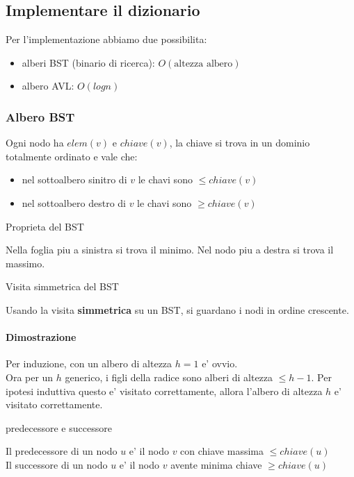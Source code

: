 \subsection{Implementare il dizionario}
Per l'implementazione abbiamo due possibilita:
\begin{itemize}
    \item alberi BST (binario di ricerca): \(O(\text{altezza albero})\)
    \item albero AVL: \(O(log n)\)
\end{itemize}

\subsubsection{Albero BST}
    Ogni nodo ha \(elem(v)\) e \(chiave(v)\), la chiave si trova in un dominio totalmente ordinato
    e vale che:
    \begin{itemize}
        \item nel sottoalbero sinitro di \(v\) le chavi sono \(\leq chiave(v)\)
        \item nel sottoalbero destro di \(v\) le chavi sono \(\ge chiave(v)\)
    \end{itemize}

    \begin{definition}{Proprieta del BST}

        Nella foglia piu a sinistra si trova il minimo. Nel nodo piu a destra si trova il massimo.
    \end{definition}

    \begin{definition}{Visita simmetrica del BST}

        Usando la visita \textbf{simmetrica} su un BST, si guardano i nodi in ordine crescente. 
    \end{definition}
    
    \paragraph{Dimostrazione}
        Per induzione, con un albero di altezza \(h=1\) e' ovvio. \\
        Ora per un \(h\) generico, i figli della radice sono alberi di altezza $\leq h-1$.
        Per ipotesi induttiva questo e' visitato correttamente, allora l'albero di altezza $h$ e' visitato correttamente.

    \begin{definition}{predecessore e successore}

        Il predecessore di un nodo $u$ e' il nodo $v$ con chiave massima $\leq chiave(u)$ \\
        Il successore di un nodo $u$ e' il nodo $v$ avente minima chiave $\geq chiave(u)$
    \end{definition}


